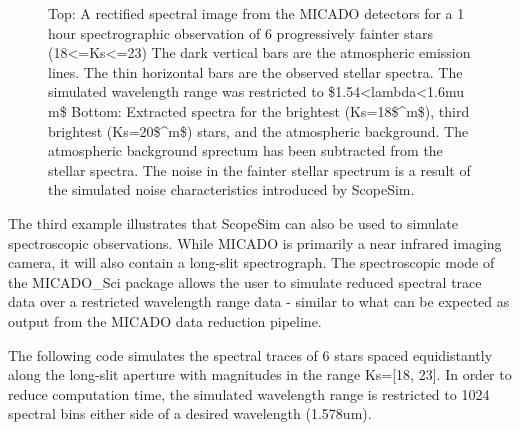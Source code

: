 \begin{figure}[H]
\noindent{}\label{fig-example-3-spectra}

\caption{Top: A rectified spectral image from the MICADO detectors for a 1 hour spectrographic observation of 6 progressively fainter stars (18<=Ks<=23)
The dark vertical bars are the atmospheric emission lines.
The thin horizontal bars are the observed stellar spectra.
The simulated wavelength range was restricted to \$1.54<lambda<1.6mu m\$
Bottom: Extracted spectra for the brightest (Ks=18\$\textasciicircum{}m\$), third brightest (Ks=20\$\textasciicircum{}m\$) stars, and the atmospheric background.
The atmospheric background sprectum has been subtracted from the stellar spectra.
The noise in the fainter stellar spectrum is a result of the simulated noise characteristics introduced by ScopeSim.}
\end{figure}

The third example illustrates that ScopeSim can also be used to simulate spectroscopic observations.
While MICADO is primarily a near infrared imaging camera, it will also contain a long-slit spectrograph.
The spectroscopic mode of the MICADO\_Sci package allows the user to simulate reduced spectral trace data over a restricted wavelength range data - similar to what can be expected as output from the MICADO data reduction pipeline.

The following code simulates the spectral traces of 6 stars spaced equidistantly along the long-slit aperture with magnitudes in the range Ks={[}18, 23{]}.
In order to reduce computation time, the simulated wavelength range is restricted to 1024 spectral bins either side of a desired wavelength (1.578um).

